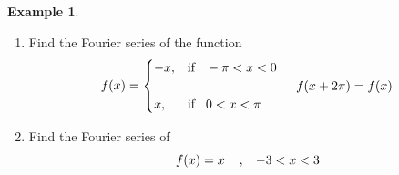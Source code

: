 \documentclass[11pt,a4paper]{article}
\theoremstyle{definition}
\newtheorem{exa}[thm]{Example}
\begin{document}
\begin{exa}
\begin{enumerate}
\item Find the Fourier series of the function
\[f(x) = 
\begin{cases}
-x, & \text{if}\hspace{0.3cm} -\pi < x < 0\\
 & \hspace{3cm} f(x +2\pi) = f(x)\\
x, & \text{if} \hspace{0.3cm} 0 < x < \pi\\
\end{cases}
\]
\item Find the Fourier series of $$f(x) =x \hspace{0.4cm}, \hspace{0.3cm}-3 < x < 3$$


\begin{figure}[H]
\centering
{}
\end{figure}
\end{enumerate}
\end{exa}
\end{document}
